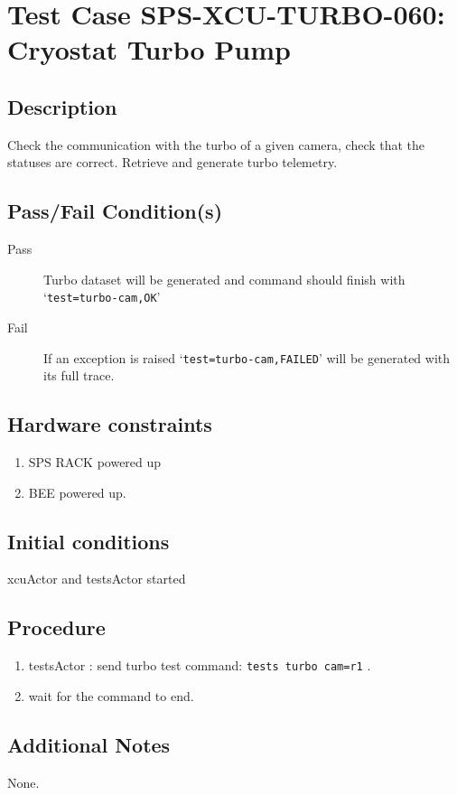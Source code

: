 \section{Test Case SPS-XCU-TURBO-060: Cryostat Turbo Pump}

\subsection{Description}

Check the communication with the turbo of a given camera, check that the statuses are correct.
Retrieve and generate turbo telemetry.

\subsection{Pass/Fail Condition(s)}

\begin{description}
\item [Pass] Turbo dataset will be generated and command should finish with `\texttt{test=turbo-cam,OK}'
\item [Fail] If an exception is raised `\texttt{test=turbo-cam,FAILED}' will be generated with its full trace.

\end{description}

\subsection{Hardware constraints}

\begin{enumerate}
    \item SPS RACK powered up
    \item BEE powered up.
\end{enumerate}

\subsection{Initial conditions}

xcuActor and testsActor started

\subsection{Procedure}

\begin{enumerate}
    \item testsActor : send turbo test command: \texttt{tests turbo cam=r1} .
    \item wait for the command to end.
\end{enumerate}

\subsection{Additional Notes}
None.
